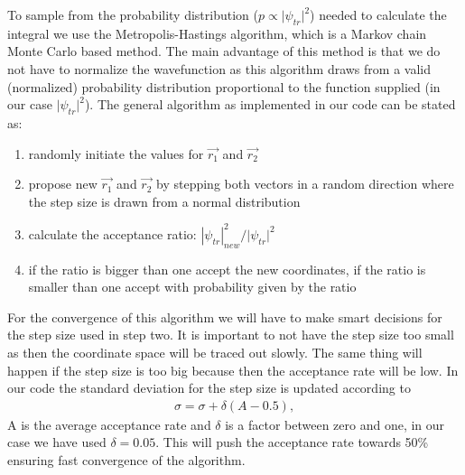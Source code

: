 To sample from the probability distribution (${p \propto |{\psi _{tr}}{|^2}}$) needed to calculate the integral we use the Metropolis-Hastings algorithm, which is a Markov chain Monte Carlo based method. The main advantage of this method is that we do not have to normalize the wavefunction as this algorithm draws from a valid (normalized) probability distribution proportional to the function supplied (in our case ${|{\psi _{tr}}{|^2}}$). The general algorithm as implemented in our code can be stated as:
\begin{enumerate}
\item randomly initiate the values for ${\overrightarrow {{r_1}} }$ and ${\overrightarrow {{r_2}} }$ 
\item  propose new ${\overrightarrow {{r_1}} }$ and ${\overrightarrow {{r_2}} }$ by stepping both vectors in a random direction where the step size is drawn from a normal distribution
\item calculate the acceptance ratio: $|{\psi _{tr}}|_{new}^2/|{\psi _{tr}}{|^2}$
\item if the ratio is bigger than one accept the new coordinates, if the ratio is smaller than one accept with probability given by the ratio
\end{enumerate}
For the convergence of this algorithm we will have to make smart decisions for the step size used in  step two. It is important to not have the step size too small as then the coordinate space will be traced out slowly. The same thing will happen if the step size is too big because then the acceptance rate will be low. In our code the standard deviation for the step size is updated according to
\begin{align}
\sigma  = \sigma  + \delta  (A - 0.5),
\end{align}
A is the average acceptance rate and $\delta$ is a factor between zero and one, in our case we have used $\delta=0.05$. This will push the acceptance rate towards 50\% ensuring fast convergence of the algorithm.


